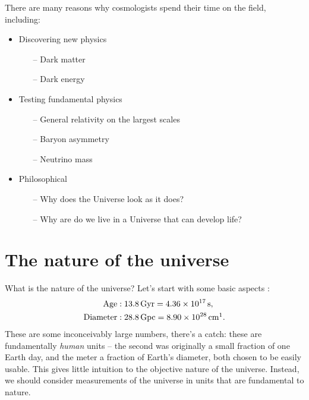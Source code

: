 \documentclass[a4paper, 12pt]{article}
\newcommand{\unit}[1]{\,\mathrm{#1}}
\begin{document}
There are many reasons why cosmologists spend their time on the field, including:
\begin{itemize}
    \item Discovering new physics
    \begin{itemize}
        \item[--] Dark matter
        \item[--] Dark energy
    \end{itemize}
    \item Testing fundamental physics
    \begin{itemize}
        \item[--] General relativity on the largest scales
        \item[--] Baryon asymmetry
        \item[--] Neutrino mass
    \end{itemize}
    \item Philosophical
    \begin{itemize}
        \item[--] Why does the Universe look as it does?
        \item[--] Why are do we live in a Universe that can develop life?
    \end{itemize}
\end{itemize}

\section{The nature of the universe}
What is the nature of the universe? Let's start with some basic aspects \cite{Planck_2018}:
\begin{align*}
    \text{Age}&: 13.8 \unit{Gyr} = 4.36 \times 10^{17} \unit{s},\\
    \text{Diameter}&: 28.8 \unit{Gpc} = 8.90 \times 10^{28} \unit{cm}\footnotemark{}.
\end{align*}
These are some inconceivably large numbers, there's a catch: these are fundamentally \textit{human} units -- the second was originally a small fraction of one Earth day, and the meter a fraction of Earth's diameter, both chosen to be easily usable. This gives little intuition to the objective nature of the universe. Instead, we should consider measurements of the universe in units that are fundamental to nature.
\end{document}

